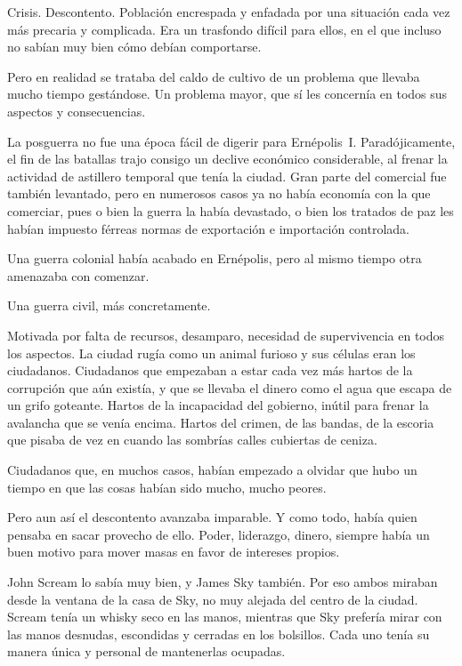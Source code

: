 Crisis. Descontento. Población encrespada y enfadada por una situación cada vez más precaria y complicada. Era un trasfondo difícil para ellos, en el que incluso no sabían muy bien cómo debían comportarse.

Pero en realidad se trataba del caldo de cultivo de un problema que llevaba mucho tiempo gestándose. Un problema mayor, que sí les concernía en todos sus aspectos y consecuencias.

\fancyparbreak
La posguerra no fue una época fácil de digerir para Ernépolis~I. Paradójicamente, el fin de las batallas trajo consigo un declive económico considerable, al frenar la actividad de astillero temporal que tenía la ciudad. Gran parte del  comercial fue también levantado, pero en numerosos casos ya no había economía con la que comerciar, pues o bien la guerra la había devastado, o bien los tratados de paz les habían impuesto férreas normas de exportación e importación controlada.

Una guerra colonial había acabado en Ernépolis, pero al mismo tiempo otra amenazaba con comenzar.

Una guerra civil, más concretamente.

Motivada por falta de recursos, desamparo, necesidad de supervivencia en todos los aspectos. La ciudad rugía como un animal furioso y sus células eran los ciudadanos. Ciudadanos que empezaban a estar cada vez más hartos de la corrupción que aún existía, y que se llevaba el dinero como el agua que escapa de un grifo goteante. Hartos de la incapacidad del gobierno, inútil para frenar la avalancha que se venía encima. Hartos del crimen, de las bandas, de la escoria que pisaba de vez en cuando las sombrías calles cubiertas de ceniza.

Ciudadanos que, en muchos casos, habían empezado a olvidar que hubo un tiempo en que las cosas habían sido mucho, mucho peores.

Pero aun así el descontento avanzaba imparable. Y como todo, había quien pensaba en sacar provecho de ello. Poder, liderazgo, dinero, siempre había un buen motivo para mover masas en favor de intereses propios.

John Scream lo sabía muy bien, y James Sky también. Por eso ambos miraban desde la ventana de la casa de Sky, no muy alejada del centro de la ciudad. Scream tenía un whisky seco en las manos, mientras que Sky prefería mirar con las manos desnudas, escondidas y cerradas en los bolsillos. Cada uno tenía su manera única y personal de mantenerlas ocupadas.

